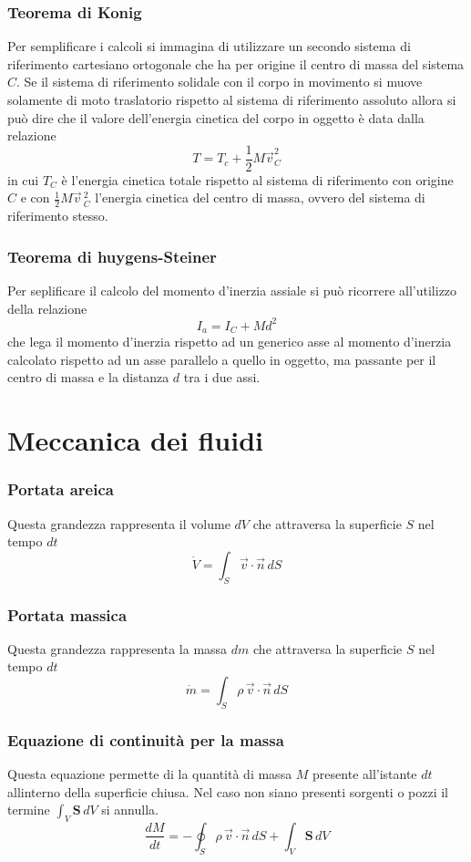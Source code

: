 \documentclass[12pt,a4paper]{report}
\begin{document}
	\subsection{Teorema di Konig}
Per semplificare i calcoli si immagina di utilizzare un secondo sistema di riferimento cartesiano ortogonale che ha per origine il centro di massa del sistema $C$. Se il sistema di riferimento solidale con il corpo in movimento si muove solamente di moto traslatorio rispetto al sistema di riferimento assoluto allora si può dire che il valore dell'energia cinetica del corpo in oggetto è data dalla relazione
	\[T=T_{c} + \frac{1}{2}M\vec{v}_{C}^{2}\]
in cui $T_{C}$ è l'energia cinetica totale rispetto al sistema di riferimento con origine $C$ e con $\frac{1}{2}M\vec{v}\,^{2}_{C}$ l'energia cinetica del centro di massa, ovvero del sistema di riferimento stesso. 
	\subsection{Teorema di huygens-Steiner}
Per seplificare il calcolo del momento d'inerzia assiale si può ricorrere all'utilizzo della relazione 
		\[I_{a}=I_{C}+Md^{2}\]
che lega il momento d'inerzia rispetto ad un generico asse al momento d'inerzia calcolato rispetto ad un asse parallelo a quello in oggetto, ma passante per il centro di massa e la distanza $d$ tra i due assi.
	
\chapter{Meccanica dei fluidi}
	\subsection{Portata areica}
Questa grandezza rappresenta il volume $dV$ che attraversa la superficie $S$ nel tempo $dt$
		\[\dot{V}=\int_{S} \vec{v}\cdot \vec{n}\,dS\]
	\subsection{Portata massica}
Questa grandezza rappresenta la massa $dm$ che attraversa la superficie $S$ nel tempo $dt$
		\[\dot{m}=\int_{S} \rho \, \vec{v}\cdot \vec{n}\,dS\]
	\subsection{Equazione di continuità per la massa}
Questa equazione permette di la quantità di massa $M$ presente all'istante $dt$ allinterno della superficie chiusa. Nel caso non siano presenti sorgenti o pozzi il termine $\int_{V} \textbf{S}\,dV$ si annulla.
		\[\frac{dM}{dt} = -\oint_{S} \rho \, \vec{v}\cdot \vec{n}\,dS + \int_{V} \textbf{S}\,dV\]
\end{document}
